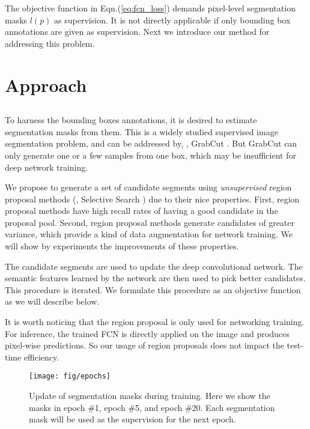 \documentclass[10pt,twocolumn,letterpaper]{article}
\begin{document}
The objective function in Eqn.(\ref{eq:fcn_loss}) demands pixel-level segmentation masks $l(p)$ as supervision. It is not directly applicable if only bounding box annotations are given as supervision. Next we introduce our method for addressing this problem.

\section{Approach}

\subsection{\fontsize{9.9pt}{1em}}

To harness the bounding boxes annotations, it is desired to estimate segmentation masks from them. This is a widely studied supervised image segmentation problem, and can be addressed by, \eg, GrabCut \cite{rother2004grabcut}. But GrabCut can only generate one or a few samples from one box, which may be insufficient for deep network training.

We propose to generate a set of candidate segments using \emph{unsupervised} region proposal methods (\eg, Selective Search \cite{uijlings2013selective}) due to their nice properties. First, region proposal methods have high recall rates \cite{arbelaez2014multiscale} of having a good candidate in the proposal pool. Second, region proposal methods generate candidates of greater variance, which provide a kind of data augmentation \cite{krizhevsky2012imagenet} for network training. We will show by experiments the improvements of these properties.

The candidate segments are used to update the deep convolutional network. The semantic features learned by the network are then used to pick better candidates. This procedure is iterated.
We formulate this procedure as an objective function as we will describe below.

It is worth noticing that the region proposal is only used for networking training. For inference, the trained FCN is directly applied on the image and produces pixel-wise predictions. So our usage of region proposals does not impact the test-time efficiency.

\begin{figure*}[t]
	\centering
	\texttt{[image: fig/epochs]}
	\caption{Update of segmentation masks during training. Here we show the masks in epoch \#1, epoch \#5, and epoch \#20. Each segmentation mask will be used as the supervision for the next epoch.}
	\label{fig:epochs}
\end{figure*}
\end{document}
